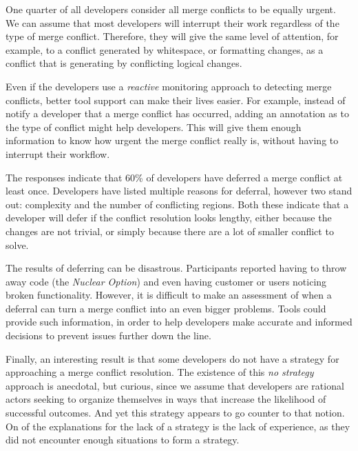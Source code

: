 One quarter of all developers consider all merge conflicts to be equally urgent.
We can assume that most developers will interrupt their work regardless of the type of merge conflict.
Therefore, they will give the same level of attention, for example, to a conflict generated by whitespace, or formatting changes, as a conflict that is generating by conflicting logical changes. 

Even if the developers use a \emph{reactive} monitoring approach to detecting merge conflicts, better tool support can make their lives easier.
For example, instead of notify a developer that a merge conflict has occurred, adding an annotation as to the type of conflict might help developers.
This will give them enough information to know how urgent the merge conflict really is, without having to interrupt their workflow.

The responses indicate that 60\% of developers have deferred a merge conflict at least once. 
Developers have listed multiple reasons for deferral, however two stand out: complexity and the number of conflicting regions.
Both these indicate that a developer will defer if the conflict resolution looks lengthy, either because the changes are not trivial, or simply because there are a lot of smaller conflict to solve.

The results of deferring can be disastrous. 
Participants reported having to throw away code (the \emph{Nuclear Option}) and even having customer or users noticing broken functionality.
However, it is difficult to make an assessment of when a deferral can turn a merge conflict into an even bigger problems.
Tools could provide such information, in order to help developers make accurate and informed decisions to prevent issues further down the line.

Finally, an interesting result is that some developers do not have a strategy for approaching a merge conflict resolution.
The existence of this \textit{no strategy} approach is anecdotal, but curious, since we assume that developers are rational actors seeking to organize themselves in ways that increase the likelihood of successful outcomes.
And yet this strategy appears to go counter to that notion.
On of the explanations for the lack of a strategy is the lack of experience, as they did not encounter enough situations to form a strategy.


